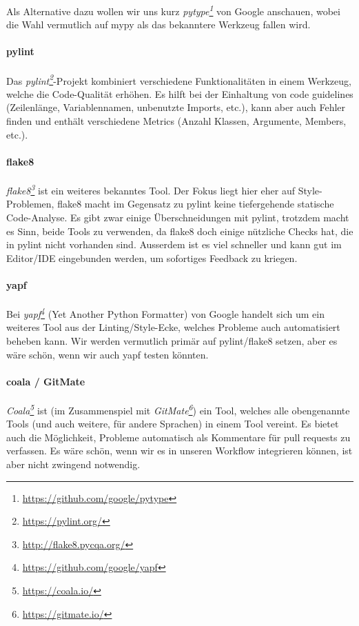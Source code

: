 \documentclass[a4paper]{article}
\begin{document}
Als Alternative dazu wollen wir uns kurz
\emph{pytype\footnote{\url{https://github.com/google/pytype}}} von Google
anschauen, wobei die Wahl vermutlich auf mypy als das bekanntere Werkzeug fallen wird.

\paragraph{pylint} Das \emph{pylint\footnote{\url{https://pylint.org/}}}-Projekt
kombiniert verschiedene Funktionalitäten in einem Werkzeug, welche die
Code-Qualität erhöhen. Es hilft bei der Einhaltung von code guidelines
(Zeilenlänge, Variablennamen, unbenutzte Imports, etc.), kann aber auch Fehler
finden und enthält verschiedene Metrics (Anzahl Klassen, Argumente, Members, etc.).

\paragraph{flake8} \emph{flake8\footnote{\url{http://flake8.pycqa.org/}}} ist
ein weiteres bekanntes Tool. Der Fokus liegt hier eher auf Style-Problemen,
flake8 macht im Gegensatz zu pylint keine tiefergehende statische Code-Analyse.
Es gibt zwar einige Überschneidungen mit pylint, trotzdem macht es Sinn, beide
Tools zu verwenden, da flake8 doch einige nützliche Checks hat, die in pylint
nicht vorhanden sind. Ausserdem ist es viel schneller und kann gut im Editor/IDE
eingebunden werden, um sofortiges Feedback zu kriegen.

\paragraph{yapf} Bei \emph{yapf\footnote{\url{https://github.com/google/yapf}}}
(Yet Another Python Formatter) von Google handelt sich um ein weiteres Tool aus
der Linting/Style-Ecke, welches Probleme auch automatisiert beheben kann. Wir
werden vermutlich primär auf pylint/flake8 setzen, aber es wäre schön, wenn wir
auch yapf testen könnten.

\paragraph{coala / GitMate} \emph{Coala\footnote{\url{https://coala.io/}}} ist
(im Zusammenspiel mit \emph{GitMate\footnote{\url{https://gitmate.io/}}}) ein
Tool, welches alle obengenannte Tools (und auch weitere, für andere Sprachen) in
einem Tool vereint. Es bietet auch die Möglichkeit, Probleme automatisch als
Kommentare für pull requests zu verfassen. Es wäre schön, wenn wir es in unseren
Workflow integrieren können, ist aber nicht zwingend notwendig.
\end{document}
